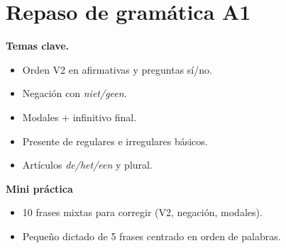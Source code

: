 \section{Repaso de gramática A1}
\textbf{Temas clave.}
\begin{itemize}[leftmargin=*]
  \item Orden V2 en afirmativas y preguntas sí/no.
  \item Negación con \textit{niet/geen}.
  \item Modales + infinitivo final.
  \item Presente de regulares e irregulares básicos.
  \item Artículos \textit{de/het/een} y plural.
\end{itemize}

\textbf{Mini práctica}
\begin{itemize}[leftmargin=*]
  \item 10 frases mixtas para corregir (V2, negación, modales).
  \item Pequeño dictado de 5 frases centrado en orden de palabras.
\end{itemize}

